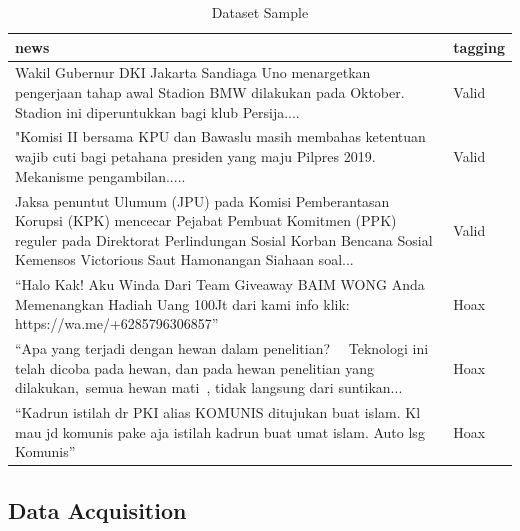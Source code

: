 \begin{table}[h]
    \caption{Dataset Sample}
    \label{tab:contoh_dataset}
    \centering
    \begin{tabular}{ | p{.8\linewidth} | l | }
        \hline
        \textbf{news}                                                                                                                                                                                                                     & \textbf{tagging} \\ \hline
        Wakil Gubernur DKI Jakarta Sandiaga Uno menargetkan pengerjaan tahap awal Stadion BMW dilakukan pada Oktober. Stadion ini diperuntukkan bagi klub Persija....                                                                     & Valid            \\ \hline
        "Komisi II bersama KPU dan Bawaslu masih membahas ketentuan wajib cuti bagi petahana presiden yang maju Pilpres 2019. Mekanisme pengambilan.....                                                                                  & Valid            \\ \hline
        Jaksa penuntut Ulumum (JPU) pada Komisi Pemberantasan Korupsi (KPK) mencecar Pejabat Pembuat Komitmen (PPK) reguler pada Direktorat Perlindungan Sosial Korban Bencana Sosial Kemensos Victorious Saut Hamonangan Siahaan soal... & Valid            \\ \hline
        “Halo Kak! Aku Winda Dari Team Giveaway BAIM WONG Anda Memenangkan Hadiah Uang 100Jt dari kami info klik: https://wa.me/+6285796306857”                                                                                           & Hoax             \\ \hline
        “Apa yang terjadi dengan hewan dalam penelitian?   Teknologi ini telah dicoba pada hewan, dan pada hewan penelitian yang dilakukan, semua hewan mati , tidak langsung dari suntikan...                                            & Hoax             \\ \hline
        “Kadrun istilah dr PKI alias KOMUNIS ditujukan buat islam. Kl mau jd komunis pake aja istilah kadrun buat umat islam. Auto lsg Komunis”                                                                                           & Hoax             \\ \hline
    \end{tabular}
\end{table}

\subsection{Data Acquisition}


